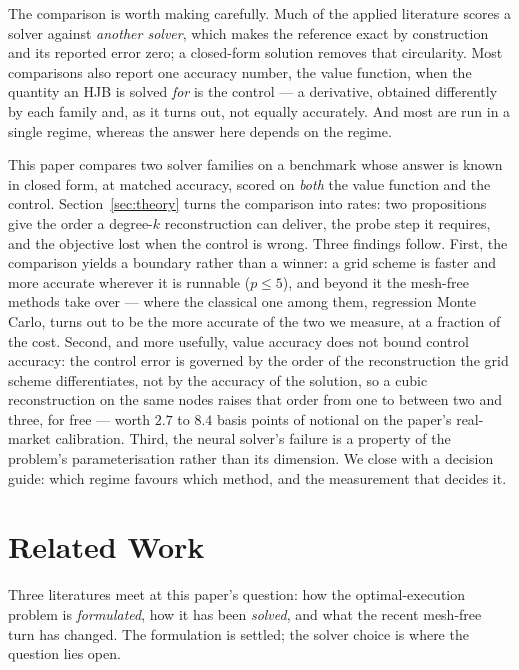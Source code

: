 \documentclass[conference]{IEEEtran}
\begin{document}
The comparison is worth making carefully. Much of the applied literature scores a solver against
\emph{another solver}, which makes the reference exact by construction and its reported error zero;
a closed-form solution removes that circularity. Most comparisons also report one accuracy number,
the value function, when the quantity an HJB is solved \emph{for} is the control --- a derivative,
obtained differently by each family and, as it turns out, not equally accurately. And most are run
in a single regime, whereas the answer here depends on the regime.

This paper compares two solver families on a benchmark whose answer is known in closed form, at
matched accuracy, scored on \emph{both} the value function and the control. Section~\ref{sec:theory}
turns the comparison into rates: two propositions give the order a degree-$k$ reconstruction can
deliver, the probe step it requires, and the objective lost when the control is wrong.
Three findings follow.
First, the comparison yields a boundary rather than a winner: a grid scheme is faster and more
accurate wherever it is runnable ($p \le 5$), and beyond it the mesh-free methods take over --- where
the classical one among them, regression Monte Carlo, turns out to be the more accurate of the two we
measure, at a fraction of the cost. Second, and
more usefully, value accuracy does not bound control accuracy: the control error is governed by the order of the reconstruction the grid scheme differentiates, not by the accuracy of the solution, so
a cubic reconstruction on the same nodes raises that order from one to between two and three, for
free --- worth $2.7$ to $8.4$ basis points of notional on the paper's real-market calibration. Third, the
neural solver's failure is a property of the problem's parameterisation rather than its dimension.
We close with a decision guide: which regime favours which method, and the measurement that decides
it.

\section{Related Work}

Three literatures meet at this paper's question: how the optimal-execution problem is
\emph{formulated}, how it has been \emph{solved}, and what the recent mesh-free turn has changed.
The formulation is settled; the solver choice is where the question lies open.
\end{document}
